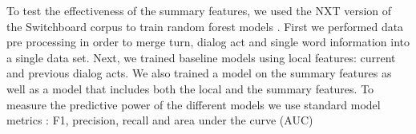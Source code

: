 To test the effectiveness of the summary features, we used the NXT version of the Switchboard corpus \cite{calhoun2010nxt,Godfrey-etal92:icassp} to train random forest models \cite{scikit-learn}. First we performed data pre processing in order to merge turn, dialog act and single word information into a single data set. Next, we trained baseline models using local features: current and previous dialog acts. We also trained a model on the summary features as well as a model that includes both the local and the summary features. To measure the predictive power of the different models we use standard model metrics : F1, precision, recall and area under the curve (AUC)

